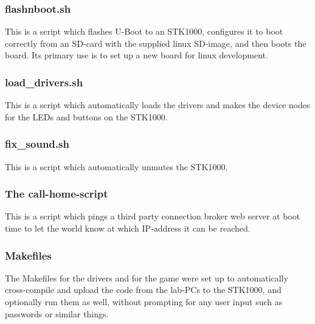 \subsubsection{flashnboot.sh}
This is a script which flashes U-Boot to an STK1000, configures it to boot correctly from an SD-card with the supplied linux SD-image, and then boots the board.
Its primary use is to set up a new board for linux development.

\subsubsection{load\_drivers.sh}
This is a script which automatically loads the drivers and makes the device nodes for the LEDs and buttons on the STK1000.

\subsubsection{fix\_sound.sh}
This is a script which automatically unmutes the STK1000.

\subsubsection{The call-home-script}
This is a script which pings a third party connection broker web server at boot time to let the world know at which IP-address it can be reached.

\subsubsection{Makefiles}
The Makefiles for the drivers and for the game were set up to automatically cross-compile and upload the code from the lab-PCs to the STK1000, and optionally run them as well, without prompting for any user input such as passwords or similar things.

